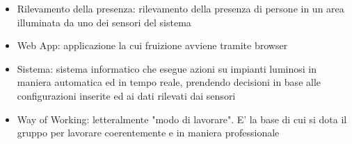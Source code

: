 \documentclass[12pt]{article}
\begin{document}
\begin{itemize}
    \item Rilevamento della presenza: rilevamento della presenza di persone in un area illuminata da uno dei sensori del sistema
    \item Web App: applicazione la cui fruizione avviene tramite browser
    \item Sistema: sistema informatico che esegue azioni su impianti luminosi in maniera automatica ed in 
    tempo reale, prendendo decisioni in base alle configurazioni inserite ed ai dati rilevati dai sensori
    \item Way of Working: letteralmente "modo di lavorare". E' la base di cui si dota il gruppo per lavorare coerentemente e in maniera professionale
\end{itemize}
\end{document}
